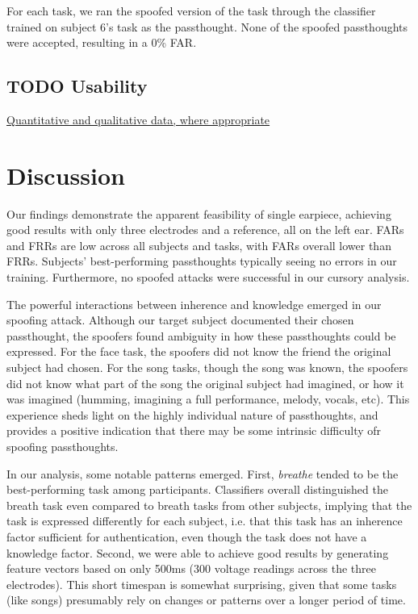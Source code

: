\documentclass[letterpaper,twocolumn,10pt]{article}
\begin{document}
For each task, we ran the spoofed version of the task through the classifier trained on subject 6's task as the passthought.
None of the spoofed passthoughts were accepted, resulting in a 0\% FAR.


\subsection{{\bfseries\sffamily TODO} Usability}
\label{sec:org18d5968}

\underline{Quantitative and qualitative data, where appropriate}

\section{Discussion}

Our findings demonstrate the apparent feasibility of single earpiece, achieving good results with only three electrodes and a reference, all on the left ear. FARs and FRRs are low across all subjects and tasks, with FARs overall lower than FRRs. Subjects' best-performing passthoughts typically seeing no errors in our training. Furthermore, no spoofed attacks were successful in our cursory analysis.

The powerful interactions between inherence and knowledge emerged in our spoofing attack. Although our target subject documented their chosen passthought, the spoofers found ambiguity in how these passthoughts could be expressed. For the face task, the spoofers did not know the friend the original subject had chosen. For the song tasks, though the song was known, the spoofers did not know what part of the song the original subject had imagined, or how it was imagined (humming, imagining a full performance, melody, vocals, etc). This experience sheds light on the highly individual nature of passthoughts, and provides a positive indication that there may be some intrinsic difficulty ofr spoofing passthoughts.

In our analysis, some notable patterns emerged. First, \textit{breathe} tended to be the best-performing task among participants. Classifiers overall distinguished the breath task even compared to breath tasks from other subjects, implying that the task is expressed differently for each subject, i.e. that this task has an inherence factor sufficient for authentication, even though the task does not have a knowledge factor. Second, we were able to achieve good results by generating feature vectors based on only 500ms (300 voltage readings across the three electrodes). This short timespan is somewhat surprising, given that some tasks (like songs) presumably rely on changes or patterns over a longer period of time. 
\end{document}
